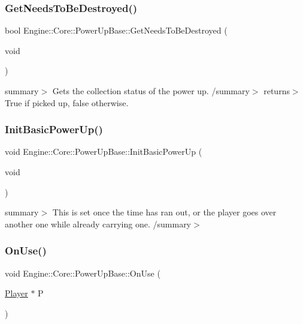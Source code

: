 \subsubsection{\texorpdfstring{Get\+Needs\+To\+Be\+Destroyed()}{GetNeedsToBeDestroyed()}}
{\footnotesize\ttfamily bool Engine\+::\+Core\+::\+Power\+Up\+Base\+::\+Get\+Needs\+To\+Be\+Destroyed (\begin{DoxyParamCaption}\item[{void}]{ }\end{DoxyParamCaption})}

summary$>$ Gets the collection status of the power up. /summary$>$ returns$>$True if picked up, false otherwise.\mbox{\label{class_engine_1_1_core_1_1_power_up_base_aa60b222fd4cd9be0b8fcca5e06ba4c62}} 
\subsubsection{\texorpdfstring{Init\+Basic\+Power\+Up()}{InitBasicPowerUp()}}
{\footnotesize\ttfamily void Engine\+::\+Core\+::\+Power\+Up\+Base\+::\+Init\+Basic\+Power\+Up (\begin{DoxyParamCaption}\item[{void}]{ }\end{DoxyParamCaption})}

summary$>$ This is set once the time has ran out, or the player goes over another one while already carrying one. /summary$>$ \mbox{\label{class_engine_1_1_core_1_1_power_up_base_a1c93516694b752a8ebc42eb181cb2b78}} 
\subsubsection{\texorpdfstring{On\+Use()}{OnUse()}}
{\footnotesize\ttfamily void Engine\+::\+Core\+::\+Power\+Up\+Base\+::\+On\+Use (\begin{DoxyParamCaption}\item[{\hyperlink{class_engine_1_1_game_play_1_1_player}{Player} $\ast$}]{P }\end{DoxyParamCaption})\hspace{0.3cm}{\ttfamily [virtual]}}

